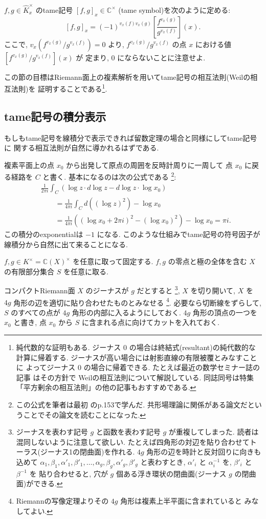 \documentclass[12pt,twoside]{jarticle}
\newcommand\C{{\mathbb C}} %
\theoremstyle{definition} %
\theoremstyle{definition} %
\theoremstyle{definition} %
\numberwithin{theorem}{section}
\numberwithin{equation}{section}
\numberwithin{figure}{section}
\numberwithin{table}{section}
\newcommand\Khat{{\widehat K}}
\newcommand\tame[3]{\left[#2,#3\right]_{#1}}
\begin{document}
$f,g\in\Khat_x^\times$ のtame記号 $\tame{x}{f}{g}\in\C^\times$
(tame symbol)を次のように定める:
\[
\tame{x}{f}{g} =
(-1)^{v_x(f)v_x(g)}\left[\frac{f^{v_x(g)}}{g^{v_x(f)}}\right](x).
\]
ここで, $v_x(f^{v_x(g)}/g^{v_x(f)})=0$ より,
$f^{v_x(g)}/g^{v_x(f)}$ の点 $x$ における値 $[f^{v_x(g)}/g^{v_x(f)}](x)$ が
定まり, $0$ にならないことに注意せよ.

この節の目標はRiemann面上の複素解析を用いてtame記号の相互法則(Weilの相互法則)を
証明することである\footnote{純代数的な証明もある.
ジーナス $0$ の場合は終結式(resultant)の純代数的な計算に帰着する.
ジーナスが高い場合には射影直線の有限被覆とみなすことに
よってジーナス $0$ の場合に帰着できる.
たとえば最近の数学セミナー誌の記事 \cite{yamazaki} はその方針で
Weilの相互法則について解説している.
同誌同号は特集「平方剰余の相互法則」の他の記事もおすすめである.
}.


\subsection{tame記号の積分表示}
\label{sec:tame-integral}

もしもtame記号を線積分で表示できれば留数定理の場合と同様にしてtame記号に
関する相互法則が自然に導かれるはずである.

複素平面上の点 $x_0$ から出発して原点の周囲を反時計周りに一周して
点 $x_0$ に戻る経路を $C$ と書く.
基本になるのは次の公式である%
\footnote{この公式を筆者は最初 \cite{deligne} のp.153で学んだ.
共形場理論に関係がある論文だということでその論文を読むことになった.}:
\begin{align*}
&
\frac{1}{2\pi i}\int_C (\log z\cdot d\log z - d\log z\cdot\log x_0)
\\ & \qquad
= \frac{1}{4\pi i}\int_C d\left((\log z)^2\right)
- \log x_0
\\ & \qquad
= \frac{1}{4\pi i}\left((\log x_0 + 2\pi i)^2 - (\log x_0)^2 \right)
- \log x_0
= \pi i.
\end{align*}
この積分のexponentialは $-1$ になる.
このような仕組みでtame記号の符号因子が線積分から自然に出て来ることになる.

$f,g\in K^\times=\C(X)^\times$ を任意に取って固定する.
$f,g$ の零点と極の全体を含む $X$ の有限部分集合 $S$ を任意に取る.

コンパクトRiemann面 $X$ のジーナスが $g$ だとすると%
\footnote{ジーナスを表わす記号 $g$ と函数を表わす記号 $g$ が重複してしまった.
読者は混同しないように注意して欲しい.
たとえば四角形の対辺を貼り合わせてトーラス(ジーナス1の閉曲面)を作れる.
$4g$ 角形の辺を時計と反対回りに向きも込めて
$\alpha_1,\beta_1,\alpha'_1,\beta'_1,\ldots,\alpha_g,\beta_g,\alpha'_g,\beta'_g$
と表わすとき, $\alpha'_i$ と $\alpha_i^{-1}$ を, $\beta'_i$ と $\beta^{-1}$ を
貼り合わせると, 穴が $g$ 個ある浮き環状の閉曲面(ジーナス $g$ の閉曲面)ができる.
},
$X$ を切り開いて, $X$ を $4g$ 角形の辺を適切に貼り合わせたものとみなせる%
\footnote{Riemannの写像定理よりその $4g$ 角形は複素上半平面に含まれていると
みなしてよい.}.
必要なら切断線をずらして,
$S$ のすべての点が $4g$ 角形の内部に入るようにしておく.
$4g$ 角形の頂点の一つを $x_0$ と書き,
点 $x_0$ から $S$ に含まれる点に向けてカットを入れておく.
\end{document}

